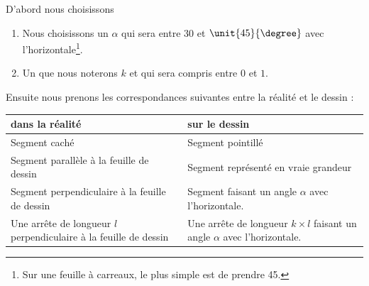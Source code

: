 \begin{Aretenir}
    D'abord nous choisissons
    \begin{enumerate}
        \item
            Nous choisissons un  \( \alpha\) qui sera entre \unit{30}{\degree} et \( \unit{45}{\degree}\) avec l'horizontale\footnote{Sur une feuille à carreaux, le plus simple est de prendre \unit{45}{\degree}.}.
        \item
            Un  que nous noterons \( k\) et qui sera compris entre \( 0\) et \( 1\).
    \end{enumerate}

    Ensuite nous prenons les correspondances suivantes entre la réalité et le dessin :
    \begin{center}
        \begin{tabular}{|p{7.5cm}|p{7.5cm}|}
            \hline
            {\bf dans la réalité}&{\bf sur le dessin}\\
            \hline\hline
            Segment caché  & Segment pointillé\\
            \hline
            Segment parallèle à la feuille de dessin & Segment représenté en vraie grandeur\\
            \hline
            Segment perpendiculaire à la feuille de dessin & Segment faisant un angle \( \alpha\) avec l'horizontale.\\
            \hline
            Une arrête de longueur \( l\) perpendiculaire à la feuille de dessin & Une arrête de longueur \( k\times l\) faisant un angle \( \alpha\) avec l'horizontale.\\
            \hline
        \end{tabular}
    \end{center}
\end{Aretenir}

